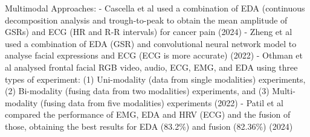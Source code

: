 Multimodal Approaches:
- Cascella et al used a combination of EDA (continuous decomposition analysis and trough-to-peak to obtain the mean amplitude of GSRs) and ECG (HR and R-R intervals) for cancer pain (2024)
- Zheng et al used a combination of EDA (GSR) and convolutional neural network model to analyse facial expressions and ECG (ECG is more accurate) (2022)
- Othman et al analysed frontal facial RGB video, audio, ECG, EMG, and EDA using three types of experiment: (1) Uni-modality (data from single modalities) experiments, (2) Bi-modality (fusing data from two modalities) experiments, and (3) Multi-modality (fusing data from five modalities) experiments (2022)
- Patil et al compared the performance of EMG, EDA and HRV (ECG) and the fusion of those, obtaining the best results for EDA (83.2\%) and fusion (82.36\%) (2024)


